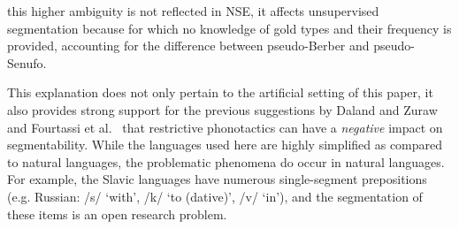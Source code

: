 \documentclass[11pt]{article}
\begin{document}
this higher ambiguity is not reflected in NSE, it affects unsupervised segmentation because for which no knowledge of gold types and their frequency is provided, accounting for the difference between pseudo-Berber and pseudo-Senufo.

This explanation does not only pertain to the artificial setting of this paper, it also provides strong support for the previous suggestions by Daland and Zuraw~ and Fourtassi et al.~ that restrictive phonotactics can have a \emph{negative} impact on segmentability. While the languages used here are highly simplified as compared to natural languages, the problematic phenomena do occur in natural languages. For example, the Slavic languages have numerous single-segment prepositions (e.g. Russian: /s/ `with', /k/ `to (dative)', /v/ `in'), and the segmentation of these items is an open research problem.
\end{document}
